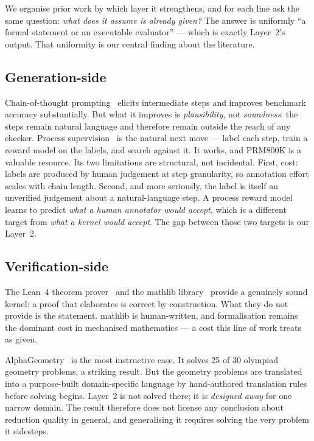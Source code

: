 \documentclass[11pt,a4paper]{article}
\begin{document}
We organise prior work by which layer it strengthens, and for each line ask the
same question: \emph{what does it assume is already given?}  The answer is
uniformly ``a formal statement or an executable evaluator'' --- which is exactly
Layer~2's output.  That uniformity is our central finding about the literature.

\subsection{Generation-side}
Chain-of-thought prompting~\cite{wei2022chain} elicits intermediate steps and
improves benchmark accuracy substantially.  But what it improves is
\emph{plausibility}, not \emph{soundness}: the steps remain natural language and
therefore remain outside the reach of any checker.  Process
supervision~\cite{lightman2023lets} is the natural next move --- label each step,
train a reward model on the labels, and search against it.  It works, and
PRM800K is a valuable resource.  Its two limitations are structural, not
incidental.  First, cost: labels are produced by human judgement at
step granularity, so annotation effort scales with chain length.  Second, and
more seriously, the label is itself an unverified judgement about a
natural-language step.  A process reward model learns to predict \emph{what a
human annotator would accept}, which is a different target from \emph{what a
kernel would accept}.  The gap between those two targets is our Layer~2.

\subsection{Verification-side}
\label{sec:rw-verify}
The Lean~4 theorem prover~\cite{moura2021lean4} and the mathlib
library~\cite{mathlib2020} provide a genuinely sound kernel: a proof that
elaborates is correct by construction.  What they do not provide is the
statement.  mathlib is human-written, and formalisation remains the dominant
cost in mechanised mathematics --- a cost this line of work treats as given.

AlphaGeometry~\cite{trinh2024alphageometry} is the most instructive case.  It
solves 25 of 30 olympiad geometry problems, a striking result.  But the geometry
problems are translated into a purpose-built domain-specific language by
hand-authored translation rules before solving begins.  Layer~2 is not solved
there; it is \emph{designed away} for one narrow domain.  The result therefore
does not license any conclusion about reduction quality in general, and
generalising it requires solving the very problem it sidesteps.
\end{document}
